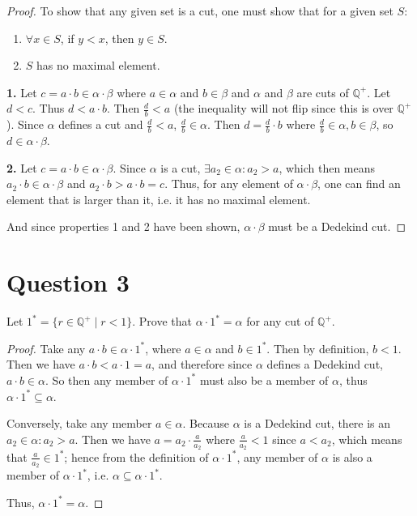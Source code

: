 \documentclass[12pt, letterpaper]{article}
\begin{document}
\begin{proof}

\noindent To show that any given set is a cut, one must show that for a given set $S$:
\begin{enumerate}
  \item $\forall x \in S$, if $y < x$, then $y \in S$.
  \item $S$ has no maximal element.
\end{enumerate}

\noindent\textbf{1.} Let $c = a \cdot b \in \alpha \cdot \beta$ where $a \in \alpha$ and $b \in \beta$ and $\alpha$ and $\beta$ are cuts of $\mathbb{Q}^+$. Let $d < c$. Thus $d < a \cdot b$. Then $\frac{d}{b} < a$ (the inequality will not flip since this is over $\mathbb{Q}^+$).
Since $\alpha$ defines a cut and $\frac{d}{b} < a$, $\frac{d}{b} \in \alpha$. Then $d = \frac{d}{b} \cdot b$ where $\frac{d}{b} \in \alpha, b \in \beta$, so $d \in \alpha \cdot \beta$.

\noindent\textbf{2.} Let $c = a \cdot b \in \alpha \cdot \beta$. Since $\alpha$ is a cut, $\exists a_2 \in \alpha: a_2 > a$,
 which then means $a_2 \cdot b \in \alpha \cdot \beta$ and $ a_2 \cdot b > a \cdot b = c$. Thus, for any element of $\alpha \cdot \beta$,
 one can find an element that is larger than it, i.e. it has no maximal element.

\noindent And since properties 1 and 2 have been shown, $\alpha \cdot \beta$ must be a Dedekind cut.
\end{proof}
\pagebreak
\section*{Question 3}
Let $1^* = \{ r \in \mathbb{Q}^+ \mid r < 1 \}$. Prove that $\alpha \cdot 1^* = \alpha$ for any cut of $\mathbb{Q}^+$.

\begin{proof}

\noindent Take any $a \cdot b \in \alpha \cdot 1^*$, where $a \in \alpha$ and $b \in 1^*$. Then by definition, $b < 1$. Then we have $a \cdot b < a \cdot 1 = a$,
and therefore since $\alpha$ defines a Dedekind cut, $a \cdot b \in \alpha$. So then any member of $\alpha \cdot 1^*$ must also be a member of $\alpha$, thus
$\alpha \cdot 1^* \subseteq \alpha$.

\noindent Conversely, take any member $a \in \alpha$. Because $\alpha$ is a Dedekind cut, there is an $a_2 \in \alpha : a_2 > a$.
Then we have $a = a_2 \cdot \frac{a}{a_2}$ where $\frac{a}{a_2} < 1$ since $a < a_2$, which means that $\frac{a}{a_2} \in 1^*$; hence from the definition of $\alpha \cdot 1^*$, any member of
$\alpha$ is also a member of $\alpha \cdot 1^*$, i.e. $\alpha \subseteq \alpha \cdot 1^*$.

\noindent Thus, $\alpha \cdot 1^* = \alpha$.

\end{proof}
\pagebreak
\end{document}
